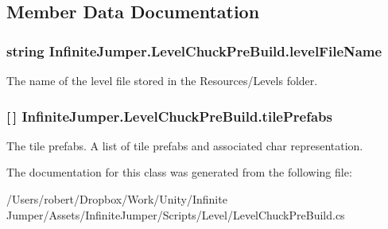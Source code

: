 \subsection{Member Data Documentation}
\hypertarget{class_infinite_jumper_1_1_level_chuck_pre_build_a0f4f1321b1075afb43ecaf941661ccba}{}
\subsubsection[{level\+File\+Name}]{\setlength{\rightskip}{0pt plus 5cm}string Infinite\+Jumper.\+Level\+Chuck\+Pre\+Build.\+level\+File\+Name}\label{class_infinite_jumper_1_1_level_chuck_pre_build_a0f4f1321b1075afb43ecaf941661ccba}


The name of the level file stored in the Resources/\+Levels folder. 

\hypertarget{class_infinite_jumper_1_1_level_chuck_pre_build_a20f873ee6a33540ada00006fb3dae662}{}
\subsubsection[{tile\+Prefabs}]{ \mbox{[}$\,$\mbox{]} Infinite\+Jumper.\+Level\+Chuck\+Pre\+Build.\+tile\+Prefabs}\label{class_infinite_jumper_1_1_level_chuck_pre_build_a20f873ee6a33540ada00006fb3dae662}


The tile prefabs. A list of tile prefabs and associated char representation. 



The documentation for this class was generated from the following file\+:\begin{DoxyCompactItemize}
\item 
/\+Users/robert/\+Dropbox/\+Work/\+Unity/\+Infinite Jumper/\+Assets/\+Infinite\+Jumper/\+Scripts/\+Level/Level\+Chuck\+Pre\+Build.\+cs\end{DoxyCompactItemize}
